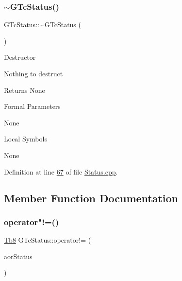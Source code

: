 \subsubsection{\texorpdfstring{$\sim$\+G\+Tc\+Status()}{~GTcStatus()}}
{\footnotesize\ttfamily G\+Tc\+Status\+::$\sim$\+G\+Tc\+Status (\begin{DoxyParamCaption}\item[{void}]{ }\end{DoxyParamCaption})}

Destructor

Nothing to destruct

\begin{DoxyReturn}{Returns}
None
\end{DoxyReturn}
\begin{DoxyParagraph}{Formal Parameters}

\begin{DoxyPre}{\ttfamily  None }\end{DoxyPre}

\end{DoxyParagraph}
\begin{DoxyParagraph}{Local Symbols}

\begin{DoxyPre}{\ttfamily  None }\end{DoxyPre}
 
\end{DoxyParagraph}


Definition at line \mbox{\hyperlink{_status_8cpp_source_l00067}{67}} of file \mbox{\hyperlink{_status_8cpp_source}{Status.\+cpp}}.



\subsection{Member Function Documentation}
\mbox{\label{class_g_n_common_1_1_g_n_notification_1_1_g_tc_status_aceaacd5106b630333a97ec3a592b7ebb}} 
\subsubsection{\texorpdfstring{operator"!=()}{operator!=()}}
{\footnotesize\ttfamily \mbox{\hyperlink{namespace_g_n_common_a8115dc7ed53b6e5b52e6bfde1632ea74}{Tb8}} G\+Tc\+Status\+::operator!= (\begin{DoxyParamCaption}\item[{const \mbox{\hyperlink{class_g_n_common_1_1_g_n_notification_1_1_g_tc_status}{G\+Tc\+Status}} \&}]{aor\+Status }\end{DoxyParamCaption})}

